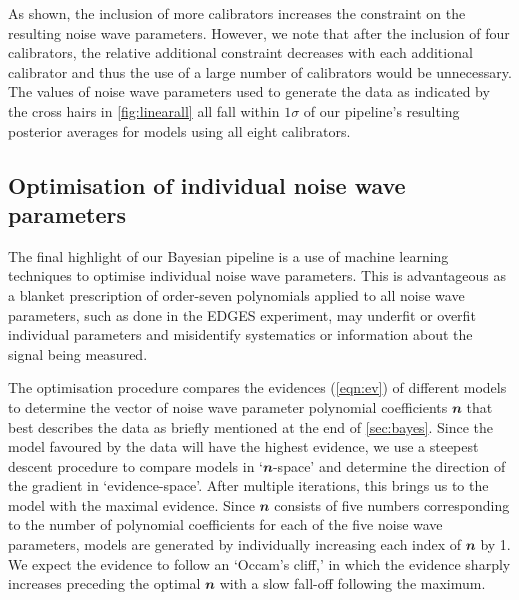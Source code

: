 As shown, the inclusion of more calibrators increases the constraint on the resulting noise wave parameters. However, we note that after the inclusion of four calibrators, the relative additional constraint decreases with each additional calibrator and thus the use of a large number of calibrators would be unnecessary. The values of noise wave parameters used to generate the data as indicated by the cross hairs in \cref{fig:linearall} all fall within $1\sigma$ of our pipeline's resulting posterior averages for models using all eight calibrators.


\subsection{Optimisation of individual noise wave parameters}\label{sec:opt}
The final highlight of our Bayesian pipeline is a use of machine learning techniques to optimise individual noise wave parameters. This is advantageous as a blanket prescription of order-seven polynomials applied to all noise wave parameters, such as done in the EDGES experiment, may underfit or overfit individual parameters and misidentify systematics or information about the signal being measured.

The optimisation procedure compares the evidences (\cref{eqn:ev}) of different models to determine the vector of noise wave parameter polynomial coefficients $\mathbfit{n}$ that best describes the data as briefly mentioned at the end of \cref{sec:bayes}. Since the model favoured by the data will have the highest evidence, we use a steepest descent procedure to compare models in `$\mathbfit{n}$-space' and determine the direction of the gradient in `evidence-space'. After multiple iterations, this brings us to the model with the maximal evidence. Since $\mathbfit{n}$ consists of five numbers corresponding to the number of polynomial coefficients for each of the five noise wave parameters, models are generated by individually increasing each index of $\mathbfit{n}$ by 1. We expect the evidence to follow an `Occam's cliff,' in which the evidence sharply increases preceding the optimal $\mathbfit{n}$ with a slow fall-off following the maximum.

